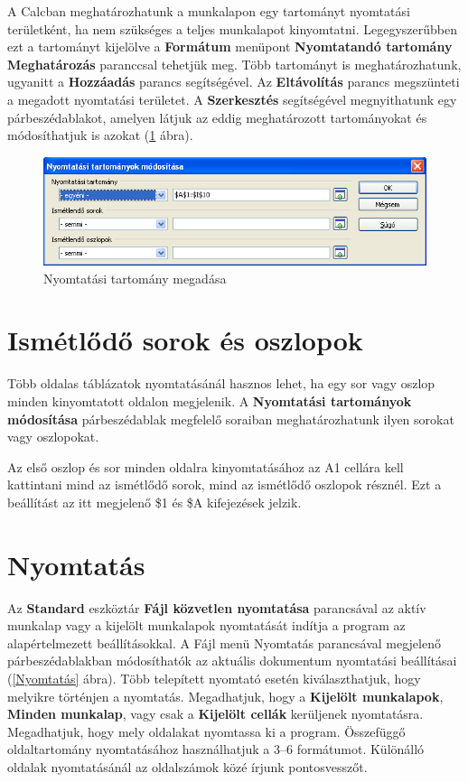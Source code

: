 A Calcban meghatározhatunk a munkalapon egy tartományt nyomtatási
területként, ha nem szükséges a teljes munkalapot kinyomtatni.
Legegyszerűbben ezt a tartományt kijelölve a
\textbf{Formátum} menüpont \textbf{Nyomtatandó tartomány}
\textbf{Meghatározás} paranccsal tehetjük meg. Több
tartományt is meghatározhatunk, ugyanitt a \textbf{Hozzáadás}
parancs segítségével. Az \textbf{Eltávolítás} parancs
megszünteti a megadott nyomtatási területet. A
\textbf{Szerkesztés} segítségével megnyithatunk egy
párbeszédablakot, amelyen látjuk az eddig meghatározott
tartományokat és módosíthatjuk is azokat (\ref{NyomtatásiTartomány} ábra).

\begin{figure}[!h]
\begin{center}
\includegraphics[width=14.999cm]{oocalcv1-img168.png}
\caption{Nyomtatási tartomány megadása}\label{NyomtatásiTartomány}
\end{center}
\end{figure}


\section{Ismétlődő sorok és oszlopok}

Több oldalas táblázatok nyomtatásánál hasznos lehet, ha egy
sor vagy oszlop minden kinyomtatott oldalon megjelenik. A
\textbf{Nyomtatási tartományok módosítása} párbeszédablak
megfelelő soraiban  meghatározhatunk ilyen sorokat vagy
oszlopokat.

Az első oszlop és sor minden oldalra kinyomtatásához az A1
cellára kell kattintani mind az ismétlődő sorok, mind az
ismétlődő oszlopok résznél. Ezt a beállítást az itt
megjelenő \$1 és \$A kifejezések jelzik.


\section{Nyomtatás}

Az \textbf{Standard} eszköztár \textbf{Fájl közvetlen
nyomtatása} parancsával az aktív munkalap vagy a kijelölt
munkalapok nyomtatását indítja a program az alapértelmezett
beállításokkal. A Fájl menü Nyomtatás parancsával
megjelenő párbeszédablakban módosíthatók az aktuális
dokumentum nyomtatási beállításai (\ref{Nyomtatás} ábra). Több
telepített nyomtató esetén kiválaszthatjuk, hogy melyikre
történjen a nyomtatás. Megadhatjuk, hogy a \textbf{Kijelölt
munkalapok}, \textbf{Minden munkalap}, vagy csak a \textbf{Kijelölt
cellák} kerüljenek nyomtatásra. Megadhatjuk, hogy mely oldalakat
nyomtassa ki a program. Összefüggő oldaltartomány
nyomtatásához használhatjuk a 3--6 formátumot. Különálló
oldalak nyomtatásánál az oldalszámok közé írjunk
pontosvesszőt.

